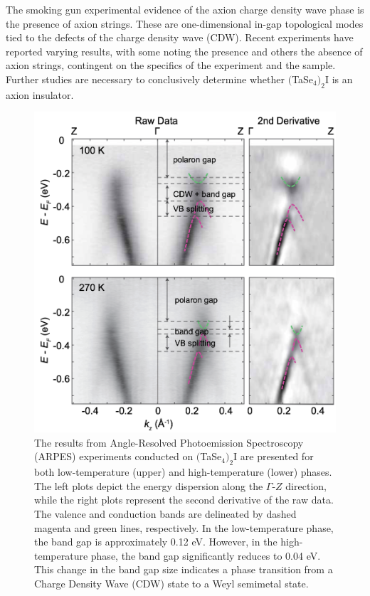 The smoking gun experimental evidence of the axion charge density wave phase is the presence of axion strings. These are one-dimensional in-gap topological modes tied to the defects of the charge density wave (CDW). Recent experiments have reported varying results, with some noting the presence\cite{litskevich2022observation} and others the absence\cite{huang2021absence} of axion strings, contingent on the specifics of the experiment and the sample. Further studies are necessary to conclusively determine whether $($TaSe$_4)_2$I is an axion insulator.

\begin{figure}[h]
    \centering
    \includegraphics[width =\textwidth]{images/ARPAS.png}
    \caption{The results from Angle-Resolved Photoemission Spectroscopy (ARPES) experiments conducted on $($TaSe$_4)_2$I are presented for both low-temperature (upper) and high-temperature (lower) phases. The left plots depict the energy dispersion along the $\Gamma$-$Z$ direction, while the right plots represent the second derivative of the raw data. The valence and conduction bands are delineated by dashed magenta and green lines, respectively. In the low-temperature phase, the band gap is approximately 0.12 eV. However, in the high-temperature phase, the band gap significantly reduces to 0.04 eV. This change in the band gap size indicates a phase transition from a Charge Density Wave (CDW) state to a Weyl semimetal state. \cite{shi2021charge}}
    \label{fig:ARPAS}
\end{figure}

